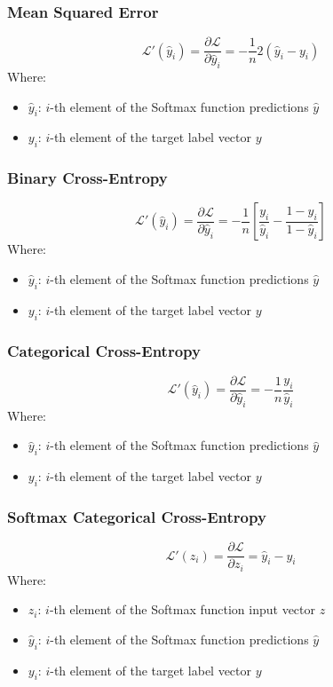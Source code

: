 \documentclass[a4paper]{article}
\newcommand{\haty}{\hat{y}}
\newcommand{\ELL}{\mathcal{L}}
\begin{document}
\subsubsection*{Mean Squared Error}
\begin{equation*}
    \ELL'(\haty_i) = \frac{\partial\ELL}{\partial \haty_i} = -\frac{1}{n}2(\haty_i-y_i)
\end{equation*}
Where:
\begin{itemize}
    \item $\haty_i$: $i$-th element of the Softmax function predictions $\haty$
    \item $y_i$: $i$-th element of the target label vector $y$
\end{itemize}

\subsubsection*{Binary Cross-Entropy}
\begin{equation*}
    \ELL'(\haty_i) = \frac{\partial\ELL}{\partial \haty_i} = -\frac{1}{n}\left[ \frac{y_i}{\haty_i} - \frac{1-y_i}{1-\haty_i} \right]
\end{equation*}
Where:
\begin{itemize}
    \item $\haty_i$: $i$-th element of the Softmax function predictions $\haty$
    \item $y_i$: $i$-th element of the target label vector $y$
\end{itemize}

\subsubsection*{Categorical Cross-Entropy}
\begin{equation*}
    \ELL'(\haty_i) = \frac{\partial\ELL}{\partial \haty_i} = -\frac{1}{n}\frac{y_i}{\haty_i}
\end{equation*}
Where:
\begin{itemize}
    \item $\haty_i$: $i$-th element of the Softmax function predictions $\haty$
    \item $y_i$: $i$-th element of the target label vector $y$
\end{itemize}

\subsubsection*{Softmax Categorical Cross-Entropy}
\begin{equation*}
    \ELL'(z_i) = \frac{\partial\ELL}{\partial z_i} = \haty_i - y_i
\end{equation*}
Where:
\begin{itemize}
    \item $z_i$: $i$-th element of the Softmax function input vector $z$
    \item $\haty_i$: $i$-th element of the Softmax function predictions $\haty$
    \item $y_i$: $i$-th element of the target label vector $y$
\end{itemize}
\end{document}
